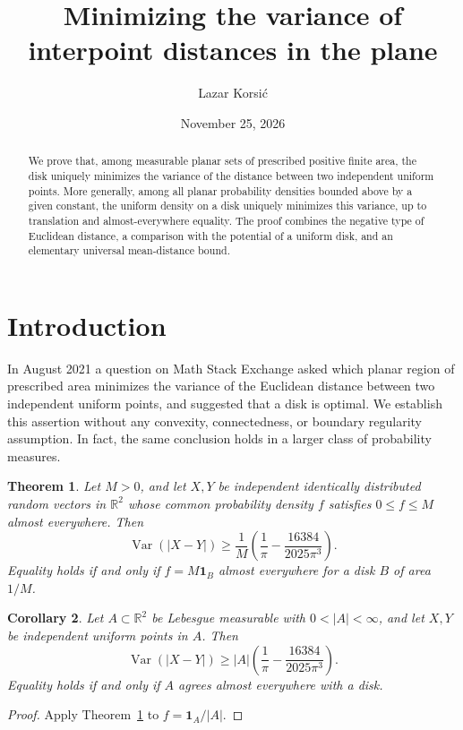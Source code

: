 \documentclass[11pt,a4paper]{amsart}
\title{Minimizing the variance of interpoint distances in the plane}
\author{Lazar Korsi\'c}
\date{November 25, 2026}
\newtheorem{theorem}{Theorem}[section]
\newtheorem{corollary}[theorem]{Corollary}
\theoremstyle{remark}
\newcommand{\R}{\mathbb R}
\newcommand{\Var}{\operatorname{Var}}
\newcommand{\ind}{\mathbf{1}}
\begin{document}
\begin{abstract}
We prove that, among measurable planar sets of prescribed positive
finite area, the disk uniquely minimizes the variance of the distance
between two independent uniform points. More generally, among all
planar probability densities bounded above by a given constant, the
uniform density on a disk uniquely minimizes this variance, up to
translation and almost-everywhere equality. The proof combines the
negative type of Euclidean distance, a comparison with the potential
of a uniform disk, and an elementary universal mean-distance bound.
\end{abstract}
\maketitle

\section{Introduction}
In August 2021 a question on Math Stack Exchange \cite{MSE} asked
which planar region of prescribed area minimizes the variance of the
Euclidean distance between two independent uniform points, and
suggested that a disk is optimal. We establish this assertion without
any convexity, connectedness, or boundary regularity assumption. In
fact, the same conclusion holds in a larger class of probability
measures.

\begin{theorem}\label{th:main}
Let $M>0$, and let $X,Y$ be independent identically distributed random
vectors in $\R^2$ whose common probability density $f$ satisfies
$0\le f\le M$ almost everywhere. Then
\begin{equation}\label{eq:main}
 \Var(|X-Y|)\ge \frac{1}{M}
 \left(\frac1\pi-\frac{16384}{2025\pi^3}\right).
\end{equation}
Equality holds if and only if $f=M\ind_B$ almost everywhere for a disk
$B$ of area $1/M$.
\end{theorem}

\begin{corollary}\label{cor:set}
Let $A\subset\R^2$ be Lebesgue measurable with $0<|A|<\infty$,
and let $X,Y$ be independent uniform points in $A$. Then
\[
 \Var(|X-Y|)\ge |A|\left(\frac1\pi-
 \frac{16384}{2025\pi^3}\right).
\]
Equality holds if and only if $A$ agrees almost everywhere with a disk.
\end{corollary}
\begin{proof}
Apply Theorem~\ref{th:main} to $f=\ind_A/|A|$.
\end{proof}
\end{document}
